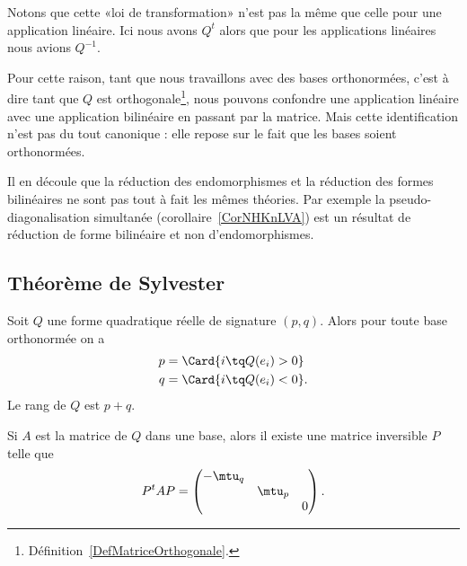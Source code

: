 \begin{remark}
    Notons que cette «loi de transformation» n'est pas la même que celle pour une application linéaire. Ici nous avons \( Q^t\) alors que pour les applications linéaires nous avions \( Q^{-1}\).

    Pour cette raison, tant que nous travaillons avec des bases orthonormées, c'est à dire tant que \( Q\) est orthogonale\footnote{Définition~\ref{DefMatriceOrthogonale}.}, nous pouvons confondre une application linéaire avec une application bilinéaire en passant par la matrice. Mais cette identification n'est pas du tout canonique : elle repose sur le fait que les bases soient orthonormées.

    Il en découle que la réduction des endomorphismes et la réduction des formes bilinéaires ne sont pas tout à fait les mêmes théories. Par exemple la pseudo-diagonalisation simultanée (corollaire~\ref{CorNHKnLVA}) est un résultat de réduction de forme bilinéaire et non d'endomorphismes.
\end{remark}

\subsection{Théorème de Sylvester}

\begin{theorem}[de Sylvester]   \label{ThoQFVsBCk}
    Soit $Q$ une forme quadratique réelle de signature \( (p,q)\). Alors pour toute base orthonormée on a
    \begin{subequations}
        \begin{align}
            p&=\Card\{ i\tq Q(e_i)>0 \}\\
            q&=\Card\{ i\tq Q(e_i)<0 \}.
        \end{align}
    \end{subequations}
    Le rang de \( Q\) est \( p+q\).

    Si \( A\) est la matrice de \( Q\) dans une base, alors il existe une matrice inversible \( P\) telle que
    \begin{equation}
        P^tAP=\begin{pmatrix}
            -\mtu_q    &       &       \\
                &   \mtu_p    &       \\
                &       &   0
        \end{pmatrix}.
    \end{equation}
\end{theorem}

